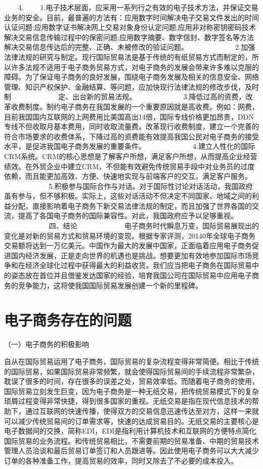 　　4.
　　1.电子技术层面，应采用一系列行之有效的电子技术方法，并保证交易业务的安全。目前，最普遍的方法有：应用数字时间解决电子交易文件发出的时间认证问题;应用数字证书解决网上交易对象身份认定问题;应用非对称密钥密码技术解决交易信息传输过程中的保密问题;应用数字摘要、数字信封、数字签名等方法解决交易信息传达后的完整、正确、未被修改的验证问题。
　　
　　　　2.加强法律法规的研究与制定。现行国际贸易法是基于传统的有纸贸易方式而制定的，所以许多法规不适用于电子商务贸易方式，对电子商务的发展会带来许多难以克服的障碍。为了保证电子商务的良好发展，围绕电子商务发展及相关的信息安全、网络管理、知识产权保护、金融结算、等问题，应加快现行法律法规的修改步伐，及时制
　　
　　　　定、出台新的贸易法规。
　　
　　　　3.降低过高的资费，改革收费制度。制约电子商务在我国发展的一个重要原因就是高收费。例如：网费，目前我国国内互联网的上网费用比美国高出14倍，国际专线价格更加昂贵，DDN专线不但收取月基本费用，同时收取流量费。改革现行收费制度，建立一个完善的符合市场要求的收费体系，下降过高的资费能有效提高我国公民对电子商务的接受水平，是促进我国电子商务发展的重要条件。
　　
　　　　4.建立人性化的国际CRM系统。CRM的核心思想是了解客户所想，满足客户所想，从而提高企业经营绩效。在外贸企业中建立CRM，不但能有效避免传统贸易手段中对业务员的过度依赖，而且能更加高效、方便、快速地实现与前端客户的交互，满足客户服务。
　　
　　　　5.积极参与国际合作与对话。对于国际性讨论对话活动，我国政府虽有参与，但不够积极。实际上，这些对话活动不但决定不同国家、地域之间的利益分配，直接影响着电子商务下新交易法律法规的制定，而且加强了世界各国的交流，提高了各国电子商务的国际兼容性。对此，我国政府应予以足够重视。
　　
　　　　四、结论
　　
　　　　电子商务时代瞬息万变，国际贸易展现出的变化是对新的贸易方式和贸易环境的变现。根据专家评测，20140年全球电子商务交易额将达到一万亿美元。中国作为最大的发展中国家，正面临着应用电子商务促进国内经济发展，正是走向世界的机遇也是挑战。想要更加有效地参加国际市场竞争和在经济全球化过程中获得最大的利益收货。我们应当把电子商务在国际贸易中的姿态放在首位并且借鉴发达国家的经验，培育我国公司在国际贸易中应用电子商务的竞争能力，这将使我国国际贸易发展创建一个新的里程碑。
\section{电子商务存在的问题}

（一）电子商务的积极影响

自从在国际贸易运用了电子商务，国际贸易的复杂流程变得非常简便。相比于传统的国际贸易，如果国际贸易非常频繁，就会使得国际贸易间的手续流程非常繁杂，耽误了很多的时间，存在很多的误差之处，贸易效率低。而随着电子商务的使用，国际贸易立刻发生巨变，因为电子商务是一种无纸交易，把传统贸易模式下的复杂琐屑过程变得非常快捷，得到很多国家的重视。无纸交易是指在现代信息技术的帮助下，通过互联网的快速传播，使得双方的交易信息迅速传达至对方，这样一来就可以减少传统贸易间的订单需求等，快速的达成贸易目的。无纸交易的主要核心是电子数据间的交换，简称EDI，EDI是指利用计算机技术和互联网的方便特点简化国际贸易的业务流程。和传统贸易相比，不需要前期的贸易准备、中期的贸易技术管理人员洽谈和最后贸易订单签订和人员跟进等。因此使用电子商务可以大大减少订单的各种准备工作，提高贸易的效率，同时又除去了不必要的成本投入。

